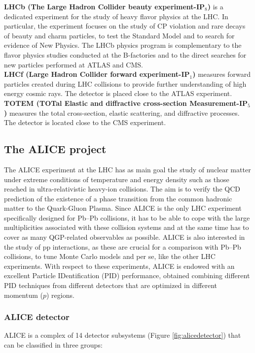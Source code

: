 \textbf{LHCb (The Large Hadron Collider beauty experiment-IP$_{8}$)} \cite{cite:proposalLHCb} is a dedicated experiment for the study of heavy flavor physics at the LHC. In particular, the experiment focuses on the study of CP violation and rare decays of beauty and charm particles, to test the Standard Model and to search for evidence of New Physics. The LHCb physics program is complementary to the flavor physics studies conducted at the B-factories and to the direct searches for new particles performed at ATLAS and CMS. \\

\textbf{LHCf (Large Hadron Collider forward experiment-IP$_{1}$)} \cite{cite:proposalLHCf} measures forward particles created during LHC collisions to provide further understanding of high energy cosmic rays. The detector is placed close to the ATLAS experiment. \\

\textbf{TOTEM (TOTal Elastic and diffractive cross-section Measurement-IP$_{5}$)} \cite{cite:proposalTOTEM} measures the total cross-section, elastic scattering, and diffractive processes. The detector is located close to the CMS experiment. \\

\subsection{The ALICE project}
The ALICE experiment at the LHC \cite{cite:ALICE} has as main goal the study of nuclear matter under extreme conditions of temperature and energy density such as those reached in ultra-relativistic heavy-ion collisions. The aim is to verify the QCD prediction of the existence of a phase transition from the common hadronic matter to the Quark-Gluon Plasma. Since ALICE is the only LHC experiment specifically designed for Pb--Pb collisions, it has to be able to cope with the large multiplicities associated with these collision systems and at the same time has to cover as many QGP-related observables as possible. ALICE is also interested in the study of pp interactions, as these are crucial for a comparison with Pb--Pb collisions, to tune Monte Carlo models and per se, like the other LHC experiments. With respect to these experiments, ALICE is endowed with an excellent Particle IDentification (PID) performance, obtained combining different PID techniques from different detectors that are optimized in different momentum ($\ensuremath{p}$) regions.

\subsubsection{ALICE detector}\label{label:alice}
ALICE is a complex of 14 detector subsystems (Figure \ref{fig:alicedetector}) that can be classified in three groups: \\

